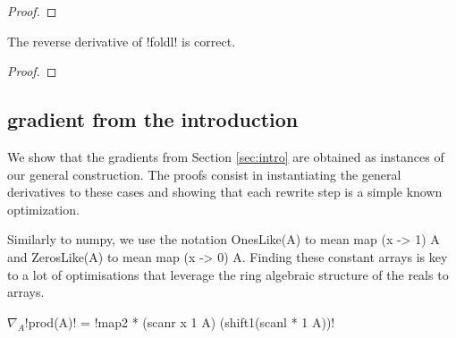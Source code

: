 \begin{proof}
    
\end{proof}

\begin{proposition}
    The reverse derivative of !foldl! is correct.
\end{proposition}

\begin{proof}
    
\end{proof}

\subsection{gradient from the introduction}

We show that the gradients from Section \ref{sec:intro} are obtained as instances of our general construction. 
The proofs consist in instantiating the general derivatives to these cases 
and showing that each rewrite step is a simple known optimization.

Similarly to numpy, we use the notation OnesLike(A) to mean map (x -> 1) A 
and ZerosLike(A) to mean map (x -> 0) A. 
Finding these constant arrays is key to a lot of optimisations that leverage the ring algebraic structure of the reals to arrays.


 \begin{lemma}
     $\nabla_A$!prod(A)! = !map2 * (scanr x 1 A) (shift1(scanl * 1 A))!
 \end{lemma}

